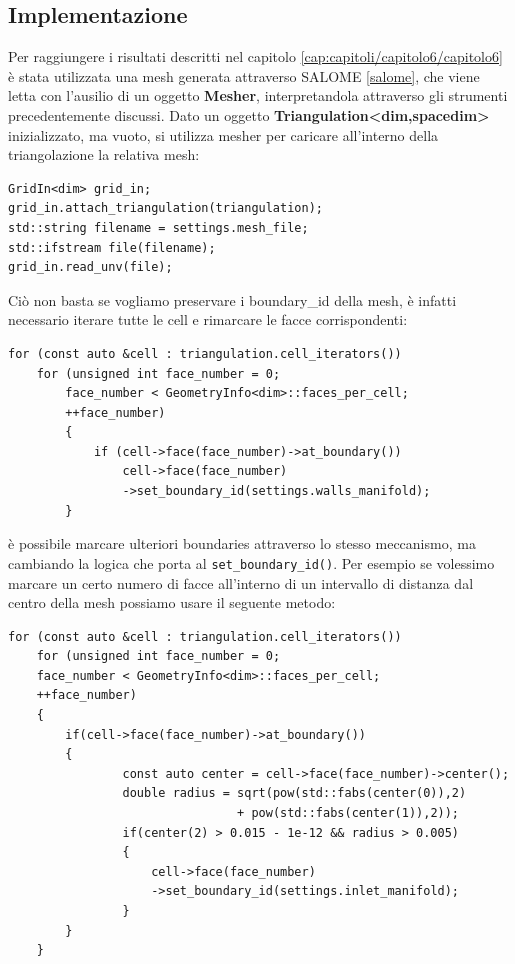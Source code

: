         \subsection{Implementazione}
        Per raggiungere i risultati descritti nel capitolo \ref*{cap:capitoli/capitolo6/capitolo6} è stata utilizzata una mesh generata attraverso SALOME \ref*{salome},
        che viene letta con l'ausilio di un oggetto \textbf{Mesher}, interpretandola attraverso gli strumenti precedentemente discussi.
        Dato un oggetto \textbf{Triangulation<dim,spacedim>} inizializzato, ma vuoto, si utilizza mesher per caricare all'interno della triangolazione la relativa mesh:
        \begin{verbatim}
GridIn<dim> grid_in;
grid_in.attach_triangulation(triangulation);
std::string filename = settings.mesh_file;
std::ifstream file(filename);
grid_in.read_unv(file);
        \end{verbatim}
        Ciò non basta se vogliamo preservare i boundary\_id della mesh, è infatti necessario iterare tutte le cell e rimarcare le facce corrispondenti:
        \begin{verbatim}
for (const auto &cell : triangulation.cell_iterators())
    for (unsigned int face_number = 0;
        face_number < GeometryInfo<dim>::faces_per_cell;
        ++face_number)
        {
            if (cell->face(face_number)->at_boundary())
                cell->face(face_number)
                ->set_boundary_id(settings.walls_manifold);
        }
        \end{verbatim}
        è possibile marcare ulteriori boundaries attraverso lo stesso meccanismo, ma cambiando la logica che porta al \texttt{set\_boundary\_id()}.
        Per esempio se volessimo marcare un certo numero di facce all'interno di un intervallo di distanza dal centro della mesh possiamo usare il seguente metodo:
        \begin{verbatim}
for (const auto &cell : triangulation.cell_iterators())
    for (unsigned int face_number = 0;
    face_number < GeometryInfo<dim>::faces_per_cell;
    ++face_number)
    {
        if(cell->face(face_number)->at_boundary())
        {
                const auto center = cell->face(face_number)->center();
                double radius = sqrt(pow(std::fabs(center(0)),2)
                                + pow(std::fabs(center(1)),2));
                if(center(2) > 0.015 - 1e-12 && radius > 0.005)
                {
                    cell->face(face_number)
                    ->set_boundary_id(settings.inlet_manifold);
                }
        }
    }
        \end{verbatim}

